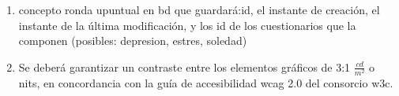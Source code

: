 \begin{enumerate}
        \item concepto ronda upuntual en bd que guardará:id, el instante de creación, el instante de la última modificación, y los id de los cuestionarios que la componen (posibles: depresion, estres, soledad)
    
        \item Se deberá garantizar un contraste entre los elementos gráficos de 3:1 $\frac{cd}{m^{2}}$ o nits, en concordancia con la guía de accesibilidad \gls{wcag} 2.0 del consorcio \gls{w3c}\cite{w3c_web_2008}.
        
    \end{enumerate}
